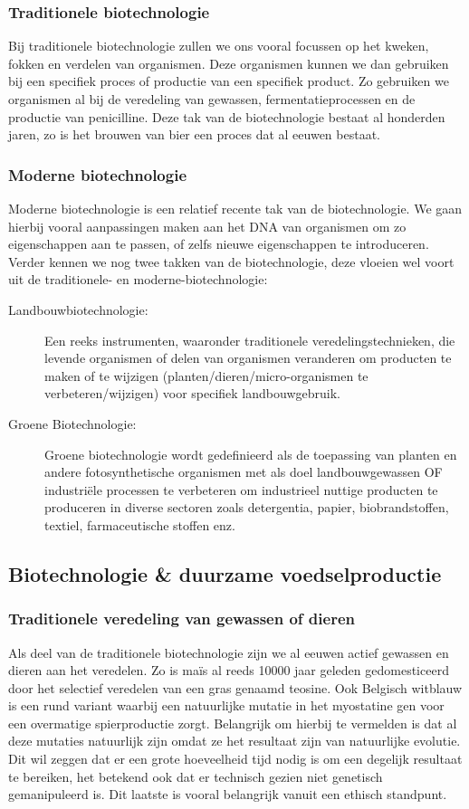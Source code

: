 \documentclass[a4paper,kul]{kulakarticle} %
\begin{document}
\subsubsection{Traditionele biotechnologie}
Bij traditionele biotechnologie zullen we ons vooral focussen op het kweken, fokken en verdelen van organismen. Deze organismen kunnen we dan gebruiken bij een specifiek proces of productie van een specifiek product. Zo gebruiken we organismen al bij de veredeling van gewassen, fermentatieprocessen en de productie van penicilline. Deze tak van de biotechnologie bestaat al honderden jaren, zo is het brouwen van bier een proces dat al eeuwen bestaat.
\subsubsection{Moderne biotechnologie}
Moderne biotechnologie is een relatief recente tak van de biotechnologie. We gaan hierbij vooral aanpassingen maken aan het DNA van organismen om zo eigenschappen aan te passen, of zelfs nieuwe eigenschappen te introduceren. 
\newpage
Verder kennen we nog twee takken van de biotechnologie, deze vloeien wel voort uit de traditionele- en moderne-biotechnologie:
\begin{description}
	\item[Landbouwbiotechnologie:] Een reeks instrumenten, waaronder traditionele veredelingstechnieken,
	die levende organismen of delen van organismen veranderen om
	producten te maken of te wijzigen (planten/dieren/micro-organismen te
	verbeteren/wijzigen) voor specifiek landbouwgebruik.
	\item[Groene Biotechnologie:] Groene biotechnologie wordt gedefinieerd als de
	toepassing van planten en andere fotosynthetische
	organismen met als doel landbouwgewassen OF
	industriële processen te verbeteren om industrieel nuttige producten te
	produceren in diverse sectoren zoals detergentia, papier,
	biobrandstoffen, textiel, farmaceutische stoffen enz.
\end{description}
\subsection{Biotechnologie \& duurzame voedselproductie}
\subsubsection{Traditionele veredeling van gewassen of dieren}
Als deel van de traditionele biotechnologie zijn we al eeuwen actief gewassen en dieren aan het veredelen. Zo is maïs al reeds \num{10000} jaar geleden gedomesticeerd door het selectief veredelen van een gras genaamd teosine. Ook Belgisch witblauw is een rund variant waarbij een natuurlijke mutatie in het myostatine gen voor een overmatige spierproductie zorgt. Belangrijk om hierbij te vermelden is dat al deze mutaties natuurlijk zijn omdat ze het resultaat zijn van natuurlijke evolutie. Dit wil zeggen dat er een grote hoeveelheid tijd nodig is om een degelijk resultaat te bereiken, het betekend ook dat er technisch gezien niet genetisch gemanipuleerd is. Dit laatste is vooral belangrijk vanuit een ethisch standpunt. 
\end{document}
